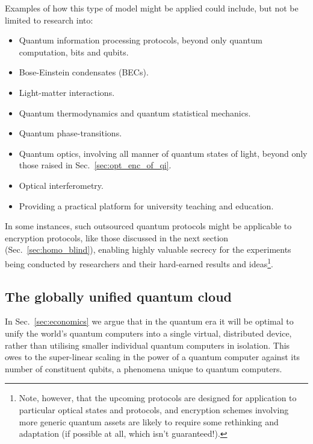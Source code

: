 Examples of how this type of model might be applied could include, but not be limited to research into:
\begin{itemize}
	\item Quantum information processing protocols, beyond only quantum computation, bits and qubits.
	\item Bose-Einstein condensates (BECs).
	\item Light-matter interactions.
	\item Quantum thermodynamics and quantum statistical mechanics.
	\item Quantum phase-transitions.
	\item Quantum optics, involving all manner of quantum states of light, beyond only those raised in Sec.~\ref{sec:opt_enc_of_qi}.
	\item Optical interferometry.
	\item Providing a practical platform for university teaching and education.
\end{itemize}

In some instances, such outsourced quantum protocols might be applicable to encryption protocols, like those discussed in the next section (Sec.~\ref{sec:homo_blind}), enabling highly valuable secrecy for the experiments being conducted by researchers and their hard-earned results and ideas\footnote{Note, however, that the upcoming protocols are designed for application to particular optical states and protocols, and encryption schemes involving more generic quantum assets are likely to require some rethinking and adaptation (if possible at all, which isn't guaranteed!).}.

%
%

\subsection{The globally unified quantum cloud}\label{sec:glob_unif_quant_cloud}

In Sec.~\ref{sec:economics} we argue that in the quantum era it will be optimal to unify the world's quantum computers into a single virtual, distributed device, rather than utilising smaller individual quantum computers in isolation. This owes to the super-linear scaling in the power of a quantum computer against its number of constituent qubits, a phenomena unique to quantum computers.

